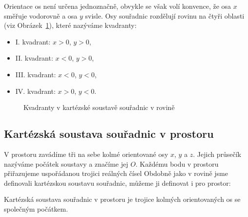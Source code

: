 Orientace os není určena jednoznačně, obvykle se však volí konvence, že osa $x$ směřuje vodorovně a osa $y$ svisle.
Osy souřadnic rozdělují rovinu na čtyři oblasti (viz Obrázek~\ref{fig:cartesian_quadrants}), které nazýváme kvadranty:
\begin{itemize}
    \item I. kvadrant: $x > 0$, $y > 0$,
    \item II. kvadrant: $x < 0$, $y > 0$,
    \item III. kvadrant: $x < 0$, $y < 0$,
    \item IV. kvadrant: $x > 0$, $y < 0$.
\end{itemize}

\begin{figure}[H]
    \centering
    \caption{Kvadranty v kartézské soustavě souřadnic v rovině}
    \label{fig:cartesian_quadrants}
\end{figure}



\subsection{Kartézská soustava souřadnic v prostoru}\label{subsec:Cartesian_coordinate_system_space}
V prostoru zavádíme tři na sebe kolmé orientované osy $x$, $y$ a $z$.
Jejich průsečík nazýváme počátek soustavy a značíme jej $O$. Každému bodu v prostoru přiřazujeme uspořádanou trojici reálných čísel
Obdobně jako v rovině jsme definovali kartézskou soustavu souřadnic, můžeme ji definovat i pro prostor:

\begin{definition}\label{def:karteska_soustava_prostor}
    Kartézská soustava souřadnic v prostoru je trojice kolmých orientovaných os se společným počátkem.
\end{definition}


